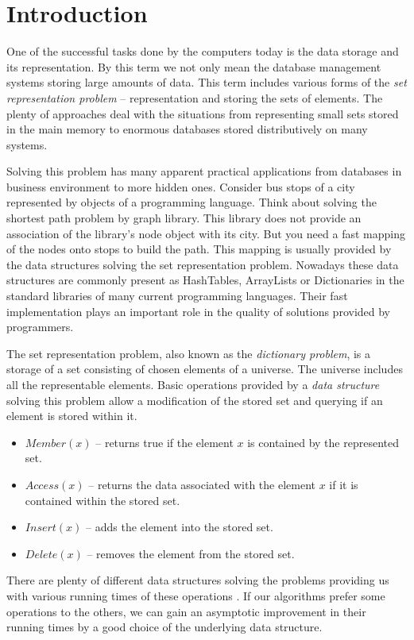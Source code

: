 \chapter{Introduction}
One of the successful tasks done by the computers today is the data storage and its representation. By this term we not only mean the database management systems storing large amounts of data. This term includes various forms of the \emph{set representation problem} \cite{VK-skripta} -- representation and storing the sets of elements. The plenty of approaches deal with the situations from representing small sets stored in the main memory to enormous databases stored distributively on many systems.

Solving this problem has many apparent practical applications from databases in business environment to more hidden ones. Consider bus stops of a city represented by objects of a programming language. Think about solving the shortest path problem by graph library. This library does not provide an association of the library's node object with its city. But you need a fast mapping of the nodes onto stops to build the path. This mapping is usually provided by the data structures solving the set representation problem. Nowadays these data structures are commonly present as HashTables, ArrayLists or Dictionaries in the standard libraries of many current programming languages. Their fast implementation plays an important role in the quality of solutions provided by programmers.

The set representation problem, also known as the \emph{dictionary problem}, is a storage of a set consisting of chosen elements of a universe. The universe includes all the representable elements. Basic operations provided by a \emph{data structure} solving this problem allow a modification of the stored set and querying if an element is stored within it.

\begin{itemize}
\item $Member(x)$ -- returns true if the element $x$ is contained by the represented set.
\item $Access(x)$ -- returns the data associated with the element $x$ if it is contained within the stored set.
\item $Insert(x)$ -- adds the element into the stored set.
\item $Delete(x)$ -- removes the element from the stored set.
\end{itemize}

There are plenty of different data structures solving the problems providing us with various running times of these operations \cite{Cormen01introductionto}. If our algorithms prefer some operations to the others, we can gain an asymptotic improvement in their running times by a good choice of the underlying data structure. 

